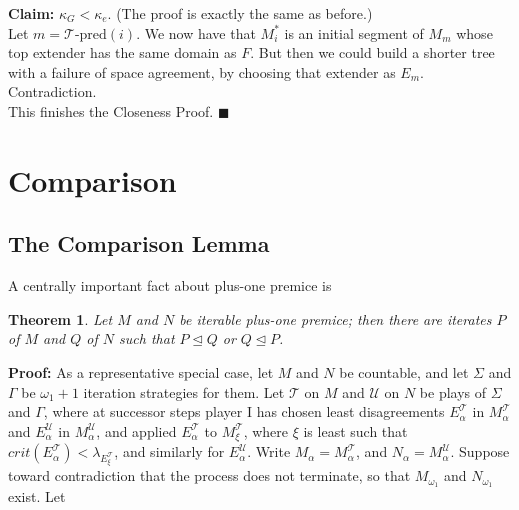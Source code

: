 \documentclass[12pt]{article}
\newtheorem{thm}{Theorem}[section]
\begin{document}
{\bfseries Claim:} $\kappa_G  < \kappa_e$.  (The proof is exactly the same as before.) \\

Let $m = \mathscr{T} \text{-pred} (i)$.  We now have that $M_i^*$ is an initial segment of $M_m$ whose top extender has the same domain as $F$.  But then we could build a shorter tree with a failure of space agreement, by choosing that extender as $E_m$.  Contradiction.\\

This finishes the Closeness Proof. $\blacksquare$\\

















\section{Comparison}

\subsection{The Comparison Lemma}

A centrally important fact about plus-one premice is\\

\begin{thm}
Let $M$ and $N$ be iterable plus-one premice; then there are iterates $P$ of $M$ and $Q$ of $N$ such that $P \unlhd Q$ or $Q \unlhd P$.
\end{thm}

\indent \indent \textbf{Proof:} As a representative special case, let $M$ and $N$ be countable, and let $\Sigma$ and $\Gamma$ be $\omega_1 + 1$ iteration strategies for them.  Let $\mathscr{T}$ on $M$ and $\mathscr{U}$ on $N$ be plays of $\Sigma$ and $\Gamma$, where at successor steps player I has chosen least disagreements $E_\alpha^{\mathscr{T}}$ in $M_\alpha^\mathscr{T}$ and $E_\alpha^{\mathscr{U}}$ in $M_\alpha^{\mathscr{U}}$, and applied $E_\alpha^{\mathscr{T}}$ to $M_\xi^{\mathscr{T}}$, where $\xi$ is least such that $crit (E_\alpha^{\mathscr{T}}) < \lambda_{E_\xi^{\mathscr{T}}}$, and similarly for $E_\alpha^{\mathscr{U}}$.  Write $M_\alpha = M_\alpha^{\mathscr{T}}$, and $N_\alpha = M_\alpha^{\mathscr{U}}$.  Suppose toward contradiction that the process does not terminate, so that $M_{\omega_1}$ and $N_{\omega_1}$ exist.  Let
\end{document}
